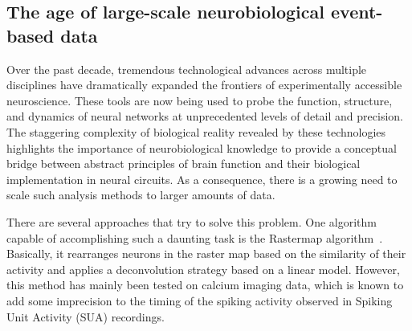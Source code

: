 \documentclass[runningheads]{llncs}
\begin{document}
\subsection{The age of large-scale neurobiological event-based data}
% 
Over the past decade, tremendous technological advances across multiple disciplines have dramatically expanded the frontiers of experimentally accessible neuroscience. %
These tools are now being used to probe the function, structure, and dynamics of neural networks at unprecedented levels of detail and precision. The staggering complexity of biological reality revealed by these technologies highlights the importance of neurobiological knowledge to provide a conceptual bridge between abstract principles of brain function and their biological implementation in neural circuits. As a consequence, there is a growing need to scale such analysis methods to larger amounts of data. 

There are several approaches that try to solve this problem. One algorithm capable of accomplishing such a daunting task is the Rastermap algorithm~\cite{pachitariu_robustness_2018}. Basically, it rearranges neurons in the raster map based on the similarity of their activity and applies a deconvolution strategy based on a linear model. However, this method has mainly been tested on calcium imaging data, which is known to add some imprecision to the timing of the spiking activity observed in Spiking Unit Activity (SUA) recordings. 
\end{document}
